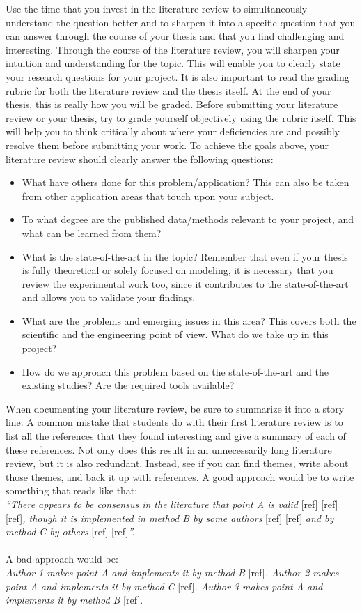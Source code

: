 \documentclass{article}
\begin{document}
Use the time that you invest in the literature review to simultaneously understand the question better and to sharpen it into a specific question that you can answer through the course of your thesis and that you find challenging and interesting. Through the course of the literature review, you will sharpen your intuition and understanding for the topic. This will enable you to clearly state your research questions for your project. It is also important to read the grading rubric for both the literature review and the thesis itself. At the end of your thesis, this is really how you will be graded. Before submitting your literature review or your thesis, try to grade yourself objectively using the rubric itself. This will help you to think critically about where your deficiencies are and possibly resolve them before submitting your work. 
To achieve the goals above, your literature review should clearly answer the following questions:
\begin{itemize}
\item What have others done for this problem/application? This can also be taken from other application areas that touch upon your subject.
\item To what degree are the published data/methods relevant to your project, and what can be learned from them?
\item What is the state-of-the-art in the topic? Remember that even if your thesis is fully theoretical or solely focused on modeling, it is necessary that you review the experimental work too, since it contributes to the state-of-the-art and allows you to validate your findings.
\item What are the problems and emerging issues in this area? This covers both the scientific and the engineering point of view. What do we take up in this project?
\item How do we approach this problem based on the state-of-the-art and the existing studies? Are the required tools available? 
\end{itemize}
When documenting your literature review, be sure to summarize it into a story line. A common mistake that students do with their first literature review is to list all the references that they found interesting and give a summary of each of these references. Not only does this result in an unnecessarily long literature review, but it is also redundant. Instead, see if you can find themes, write about those themes, and back it up with references. A good approach would be to write something that reads like that:
\\\textit{“There appears to be consensus in the literature that point A is valid} [ref] [ref] [ref]\textit{, though it is implemented in method B by some authors} [ref] [ref] \textit{and by method C by others} [ref] [ref]\textit{”.}
\\\\A bad approach would be: 
\\\textit{Author 1 makes point A and implements it by method B} [ref]\textit{. Author 2 makes point A and implements it by method C} [ref]\textit{. Author 3 makes point A and implements it by method B} [ref].\newline
\end{document}
